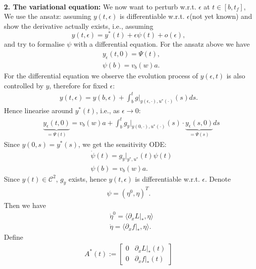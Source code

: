 \documentclass[a4paper,11pt,fleqn]{book}
\theoremstyle{definition}
\theoremstyle{remark}
\begin{document}
\quad\\
\textbf{2. The variational equation: } We now want to perturb w.r.t. $\epsilon$ at $t \in [b, t_f]$,  We use the ansatz: assuming $y(t, \epsilon)$ is differentiable w.r.t. $\epsilon$(not yet known) and show the derivative actually exists, i.e., assuming 
\begin{equation}
	y(t, \epsilon) = y^*(t) + \epsilon \psi(t) + o(\epsilon),
\end{equation}
and try to formalise $\psi$ with a differential equation. For the ansatz above we have
\begin{align*}
	&y_\epsilon (t, 0) = \Psi(t), \\
	&\psi(b) = v_b(w)a. 
\end{align*}
For the differential equation we observe the evolution process of $y(\epsilon, t)$ is also controlled by $y$, therefore for fixed $\epsilon$:
\begin{align*}
	y(t, \epsilon) = y(b, \epsilon) + \int_b^t g|_{y(\epsilon, \cdot), u^*(\cdot)}(s) ds.
\end{align*}
Hence linearise around $y^*(t)$, i.e.,  as $\epsilon \rightarrow 0$:
\begin{align*}
	& \underbrace{y_\epsilon(t, 0)}_{= \Psi(t)}  = v_b(w) a  + \int_b^t g_y\bigg|_{y(0, \cdot), u^*(\cdot)}(s) \cdot  \underbrace{y_\epsilon (s, 0)}_{= \Psi(s)} ds
\end{align*}
Since $y(0, s) = y^*(s)$, we get the sensitivity ODE:
\begin{equation}
\begin{aligned}
	& \dot{\psi}(t) =  g_y\bigg|_{y^*, u^*}(t) \psi(t) \\
	& \psi(b) = v_b(w)a. 
\end{aligned}
\end{equation}
Since $y(t) \in \mathcal{C}^2$, $g_y$ exists, hence $y(t, \epsilon)$ is differentiable w.r.t. $\epsilon$. Denote 
\begin{align*}
	\psi = (\eta^0, \eta)^T.
\end{align*}
Then we have
\begin{equation*}
\begin{aligned}
	& \dot{\eta}^0 = \langle \partial_x L|_*, \eta \rangle\\
	& \dot{\eta} = \langle \partial_x f|_*, \eta \rangle. 
\end{aligned}
\end{equation*}
Define
\begin{align*}
A^*(t):= 
\begin{bmatrix}
	0 & \partial_x L|_*(t)\\
	0 & \partial_xf|_*(t)
\end{bmatrix}
\end{align*}
\end{document}
